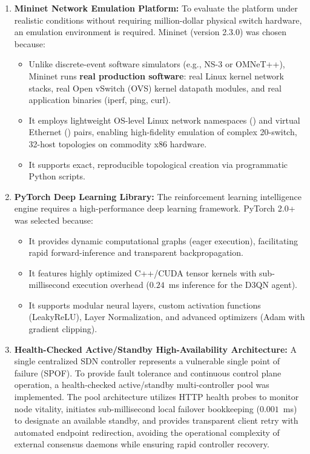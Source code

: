 \documentclass[12pt,a4paper,oneside]{report}
\newcommand{\code}[1]{\relax\ifmmode\text{\small\ttfamily\nolinkurl{#1}}\else{\small\ttfamily\nolinkurl{#1}}\fi}
\begin{document}
\begin{enumerate}
    \item \textbf{Mininet Network Emulation Platform:}
    To evaluate the platform under realistic conditions without requiring million-dollar physical switch hardware, an emulation environment is required. Mininet (version 2.3.0) was chosen because:
    \begin{itemize}
        \item Unlike discrete-event software simulators (e.g., NS-3 or OMNeT++), Mininet runs \textbf{real production software}: real Linux kernel network stacks, real Open vSwitch (OVS) kernel datapath modules, and real application binaries (iperf, ping, curl).
        \item It employs lightweight OS-level Linux network namespaces (\code{netns}) and virtual Ethernet (\code{veth}) pairs, enabling high-fidelity emulation of complex 20-switch, 32-host topologies on commodity x86 hardware.
        \item It supports exact, reproducible topological creation via programmatic Python scripts.
    \end{itemize}

    \item \textbf{PyTorch Deep Learning Library:}
    The reinforcement learning intelligence engine requires a high-performance deep learning framework. PyTorch 2.0+ was selected because:
    \begin{itemize}
        \item It provides dynamic computational graphs (eager execution), facilitating rapid forward-inference and transparent backpropagation.
        \item It features highly optimized C++/CUDA tensor kernels with sub-millisecond execution overhead ($0.24$~ms inference for the D3QN agent).
        \item It supports modular neural layers, custom activation functions (LeakyReLU), Layer Normalization, and advanced optimizers (Adam with gradient clipping).
    \end{itemize}

    \item \textbf{Health-Checked Active/Standby High-Availability Architecture:}
    A single centralized SDN controller represents a vulnerable single point of failure (SPOF). To provide fault tolerance and continuous control plane operation, a health-checked active/standby multi-controller pool was implemented. The pool architecture utilizes HTTP health probes to monitor node vitality, initiates sub-millisecond local failover bookkeeping ($0.001$~ms) to designate an available standby, and provides transparent client retry with automated endpoint redirection, avoiding the operational complexity of external consensus daemons while ensuring rapid controller recovery.


\end{enumerate}
\end{document}
